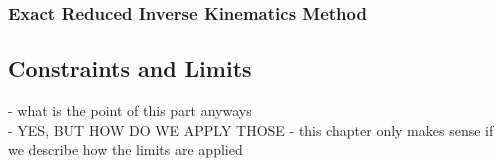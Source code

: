 \documentclass[]{article}
\begin{document}
\subsubsection{Exact Reduced Inverse Kinematics Method}






\subsection{Constraints and Limits}

\alert{
	- what is the point of this part anyways \\
	- YES, BUT HOW DO WE APPLY THOSE - this chapter only makes sense if we describe how the limits are applied \\
}

\end{document}
